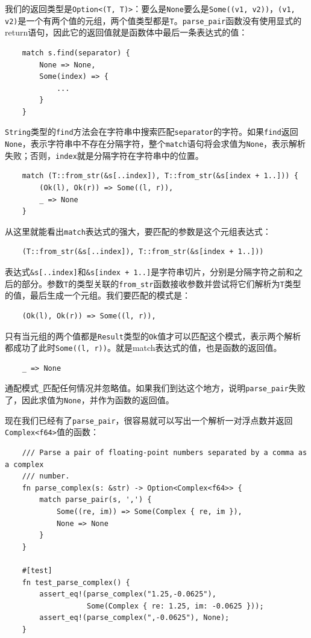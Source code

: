 我们的返回类型是\texttt{Option<(T, T)>}：要么是\texttt{None}要么是\texttt{Some((v1, v2))}，\texttt{(v1, v2)}是一个有两个值的元组，两个值类型都是\texttt{T}。\texttt{parse\_pair}函数没有使用显式的return语句，因此它的返回值就是函数体中最后一条表达式的值：
\begin{verbatim}
    match s.find(separator) {
        None => None,
        Some(index) => {
            ...
        }
    }
\end{verbatim}

\texttt{String}类型的\texttt{find}方法会在字符串中搜索匹配\texttt{separator}的字符。如果\texttt{find}返回\texttt{None}，表示字符串中不存在分隔字符，整个\texttt{match}语句将会求值为\texttt{None}，表示解析失败；否则，\texttt{index}就是分隔字符在字符串中的位置。

\begin{verbatim}
    match (T::from_str(&s[..index]), T::from_str(&s[index + 1..])) {
        (Ok(l), Ok(r)) => Some((l, r)),
        _ => None
    }
\end{verbatim}

从这里就能看出\texttt{match}表达式的强大，要匹配的参数是这个元组表达式：
\begin{verbatim}
    (T::from_str(&s[..index]), T::from_str(&s[index + 1..]))
\end{verbatim}
表达式\texttt{\&s[..index]}和\texttt{\&s[index + 1..]}是字符串切片，分别是分隔字符之前和之后的部分。参数\texttt{T}的类型关联的\texttt{from\_str}函数接收参数并尝试将它们解析为\texttt{T}类型的值，最后生成一个元组。我们要匹配的模式是：
\begin{verbatim}
    (Ok(l), Ok(r)) => Some((l, r)),
\end{verbatim}

只有当元组的两个值都是\texttt{Result}类型的\texttt{Ok}值才可以匹配这个模式，表示两个解析都成功了此时\texttt{Some((l, r))}。就是match表达式的值，也是函数的返回值。

\begin{verbatim}
    _ => None
\end{verbatim}

通配模式\texttt{\_}匹配任何情况并忽略值。如果我们到达这个地方，说明\texttt{parse\_pair}失败了，因此求值为\texttt{None}，并作为函数的返回值。

现在我们已经有了\texttt{parse\_pair}，很容易就可以写出一个解析一对浮点数并返回\texttt{Complex<f64>}值的函数：
\begin{verbatim}
    /// Parse a pair of floating-point numbers separated by a comma as a complex
    /// number.
    fn parse_complex(s: &str) -> Option<Complex<f64>> {
        match parse_pair(s, ',') {
            Some((re, im)) => Some(Complex { re, im }),
            None => None
        }
    }

    #[test]
    fn test_parse_complex() {
        assert_eq!(parse_complex("1.25,-0.0625"),
                   Some(Complex { re: 1.25, im: -0.0625 }));
        assert_eq!(parse_complex(",-0.0625"), None);
    }
\end{verbatim}

